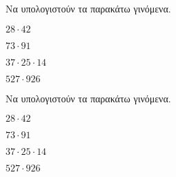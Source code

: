 Να υπολογιστούν τα παρακάτω γινόμενα.
\begin{multicols}{2}
\begin{rlist}
\item $ 28\cdot42 $
\item $ 73\cdot91 $
\item $ 37\cdot25\cdot14 $
\item $ 527\cdot926 $
\end{rlist}
\end{multicols}
Να υπολογιστούν τα παρακάτω γινόμενα.
\begin{multicols}{2}
\begin{rlist}
\item $ 28\cdot42 $
\item $ 73\cdot91 $
\item $ 37\cdot25\cdot14 $
\item $ 527\cdot926 $
\end{rlist}
\end{multicols}
